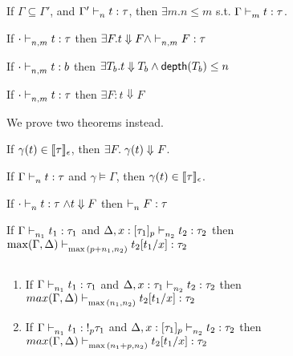 \begin{lem}
	\label{lem:subext}
	If $\Gamma \subseteq \Gamma'$,  and $\Gamma' \mathrel{\vdash_{n}^{} {t} : {\tau}}$, then $\exists m. n \leq m$ s.t.  $\Gamma  \mathrel{\vdash_{m}^{} {t} : {\tau}} $. \\
\end{lem}
%
%
%
\begin{thm}
	If $\cdot \mathrel{\vdash_{n,m}^{} {t} : {\tau}} $ then $ \exists F. t \Downarrow F \land \mathrel{\vdash_{n,m}^{} {F} : {\tau}}$
\end{thm}
%
\begin{coro}
\label{cor:typesafety}
	If $ \cdot\mathrel{\vdash_{n,m}^{} {t} : {b}} $ then $ \exists T_b. t \Downarrow T_b \land \mathsf{depth}(T_b) \leq n$
\end{coro}
%

\begin{thm}[Normalization] 
	If $\cdot\mathrel{\vdash_{n,m}^{} {t} : {\tau}} $ then $ \exists F: t \Downarrow F $
\end{thm}
We prove two theorems instead.
\begin{thm}
If $\gamma(t) \in \llbracket {\tau} \rrbracket_{\epsilon} $, then $\exists F.\mathrel{ { \gamma(t)} \Downarrow^{} { F} }$.
\end{thm}
%
%
\begin{thm}
 If $\Gamma \mathrel{\vdash_{n}^{} {t} : {\tau}}$ and $\gamma \vDash{\Gamma}$, then $\gamma(t) \in \llbracket {\tau} \rrbracket_{\epsilon} $.
\end{thm} 

\begin{thm}[Preservation]
	If $\cdot\mathrel{\vdash_{n}^{} {t} : {\tau}} \land t \Downarrow F$ then $ \mathrel{\vdash_{n}^{} {F} : {\tau}} $
\end{thm}
%
%
\begin{thm} [Substitution]
	If $\Gamma \mathrel{\vdash_{n_1}^{} {t_1} : {\tau_1}}$  and   $\Delta, x: [\tau_1]_p \mathrel{\vdash_{n_2}^{} {t_2} : {\tau_2}}$ then $\max( \Gamma,\Delta) \mathrel{\vdash_{\max{(p + n_1, n_2)}}^{} {t_2[t_1/x]} : {\tau_2}} $
\end{thm}
%
%
\begin{thm} [Substitution] $ $
\label{thm:sub}
\begin{enumerate}
    \item If $\Gamma \mathrel{\vdash_{n_1}^{} {t_1} : {\tau_1}}$  and   $\Delta, x: \tau_1 \mathrel{\vdash_{n_2}^{} {t_2} : {\tau_2}}$ then $max(\Gamma, \Delta) \mathrel{\vdash_{\max{(n_1, n_2)}}^{} {t_2[t_1/x]} : {\tau_2}} $
    \item If $\Gamma \mathrel{\vdash_{n_1}^{} { t_1} : {!_p \tau_1}}$  and   $\Delta, x: [\tau_1]_p \mathrel{\vdash_{n_2}^{} {t_2} : {\tau_2}}$ then $max(\Gamma, \Delta) \mathrel{\vdash_{\max{(n_1 + p, n_2)}}^{} {t_2[t_1/x]} : {\tau_2}} $
\end{enumerate}
\end{thm}

%
%
